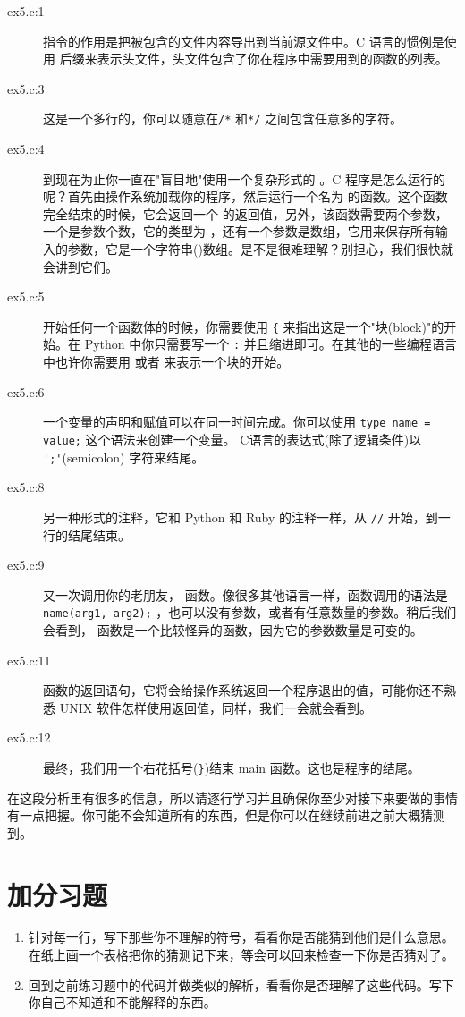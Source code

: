 \begin{description}
\item[ex5.c:1]  指令的作用是把被包含的文件内容导出到当前源文件中。C 语言的惯例是使用  后缀来表示头文件，头文件包含了你在程序中需要用到的函数的列表。
\item[ex5.c:3] 这是一个多行的，你可以随意在\verb|/*| 和\verb|*/| 之间包含任意多的字符。
\item[ex5.c:4] 到现在为止你一直在"盲目地"使用一个复杂形式的 。C 程序是怎么运行的呢？首先由操作系统加载你的程序，然后运行一个名为  的函数。这个函数完全结束的时候，它会返回一个  的返回值，另外，该函数需要两个参数，一个是参数个数，它的类型为 ，还有一个参数是数组，它用来保存所有输入的参数，它是一个字符串()数组。是不是很难理解？别担心，我们很快就会讲到它们。
\item[ex5.c:5] 开始任何一个函数体的时候，你需要使用 \verb|{| 来指出这是一个"块(block)"的开始。在 Python 中你只需要写一个 \verb|:| 并且缩进即可。在其他的一些编程语言中也许你需要用  或者  来表示一个块的开始。
\item[ex5.c:6] 一个变量的声明和赋值可以在同一时间完成。你可以使用 \verb|type name = value;| 这个语法来创建一个变量。
    C语言的表达式(除了逻辑条件)以 \verb|';'|(semicolon) 字符来结尾。
\item[ex5.c:8] 另一种形式的注释，它和 Python 和 Ruby 的注释一样，从 \verb|//| 开始，到一行的结尾结束。
\item[ex5.c:9] 又一次调用你的老朋友， 函数。像很多其他语言一样，函数调用的语法是 \verb|name(arg1, arg2);| ，也可以没有参数，或者有任意数量的参数。稍后我们会看到，  函数是一个比较怪异的函数，因为它的参数数量是可变的。
\item[ex5.c:11] 函数的返回语句，它将会给操作系统返回一个程序退出的值，可能你还不熟悉 UNIX 软件怎样使用返回值，同样，我们一会就会看到。
\item[ex5.c:12] 最终，我们用一个右花括号(\verb|}|)结束 main 函数。这也是程序的结尾。
\end{description}

在这段分析里有很多的信息，所以请逐行学习并且确保你至少对接下来要做的事情有一点把握。你可能不会知道所有的东西，但是你可以在继续前进之前大概猜测到。

\section{加分习题}

\begin{enumerate}
\item 针对每一行，写下那些你不理解的符号，看看你是否能猜到他们是什么意思。在纸上画一个表格把你的猜测记下来，等会可以回来检查一下你是否猜对了。
\item 回到之前练习题中的代码并做类似的解析，看看你是否理解了这些代码。写下你自己不知道和不能解释的东西。
\end{enumerate}
